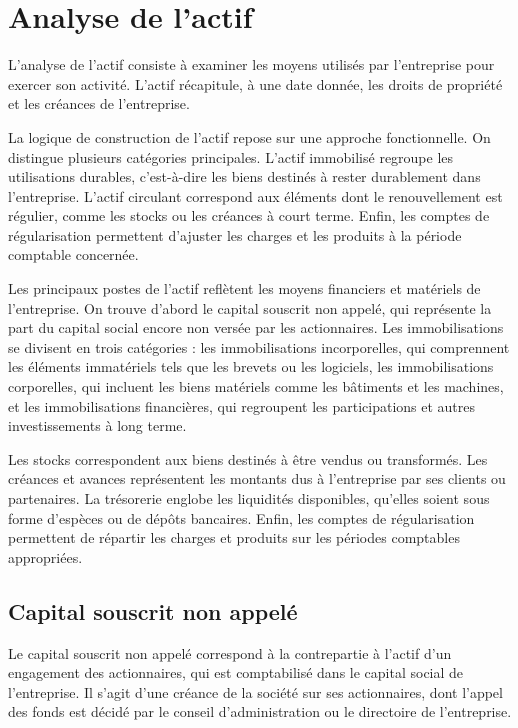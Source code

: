 \documentclass[a4paper, 12pt]{report}
\begin{document}
\section{Analyse de l'actif}

L'analyse de l'actif consiste à examiner les moyens utilisés par l'entreprise pour exercer son activité. L'actif récapitule, à une date donnée, les droits de propriété et les créances de l'entreprise. 

La logique de construction de l'actif repose sur une approche fonctionnelle. On distingue plusieurs catégories principales. L'actif immobilisé regroupe les utilisations durables, c'est-à-dire les biens destinés à rester durablement dans l'entreprise. L'actif circulant correspond aux éléments dont le renouvellement est régulier, comme les stocks ou les créances à court terme. Enfin, les comptes de régularisation permettent d'ajuster les charges et les produits à la période comptable concernée.

Les principaux postes de l'actif reflètent les moyens financiers et matériels de l'entreprise. On trouve d'abord le capital souscrit non appelé, qui représente la part du capital social encore non versée par les actionnaires. Les immobilisations se divisent en trois catégories : les immobilisations incorporelles, qui comprennent les éléments immatériels tels que les brevets ou les logiciels, les immobilisations corporelles, qui incluent les biens matériels comme les bâtiments et les machines, et les immobilisations financières, qui regroupent les participations et autres investissements à long terme. 

Les stocks correspondent aux biens destinés à être vendus ou transformés. Les créances et avances représentent les montants dus à l'entreprise par ses clients ou partenaires. La trésorerie englobe les liquidités disponibles, qu'elles soient sous forme d'espèces ou de dépôts bancaires. Enfin, les comptes de régularisation permettent de répartir les charges et produits sur les périodes comptables appropriées.

\subsection{Capital souscrit non appelé}

Le capital souscrit non appelé correspond à la contrepartie à l'actif d'un engagement des actionnaires, qui est comptabilisé dans le capital social de l'entreprise. Il s'agit d'une créance de la société sur ses actionnaires, dont l'appel des fonds est décidé par le conseil d'administration ou le directoire de l'entreprise. 
\end{document}
